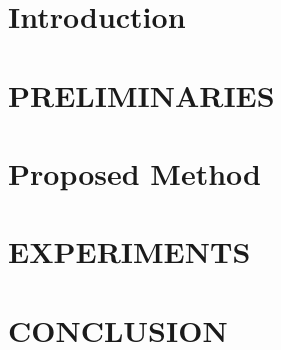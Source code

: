 \documentclass[10pt]{jarticle}
\begin{document}
\maketitle



\section{Introduction}\label{sec:Introduction}


\clearpage

\section{PRELIMINARIES}\label{sec:Preliminaries}


\section{Proposed Method}\label{sec:ProposedMethod}



\section{EXPERIMENTS}\label{sec:Experiments}


\section{CONCLUSION}\label{sec:Conclusion}


\clearpage

\begin{spacing}{0.85}
    
    \small
    \setlength{\itemsep}{0pt}
    
\end{spacing}

\end{document}
